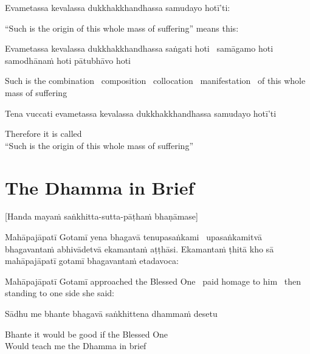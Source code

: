 Evametassa kevalassa dukkhakkhandhassa samudayo hotī’ti:

\begin{cprenglish}
  “Such is the origin of this whole mass of suffering” means this:
\end{cprenglish}

Evametassa kevalassa dukkhakkhandhassa saṅgati hoti \breathmark\ samāgamo hoti samodhānaṁ hoti pātubhāvo hoti

\begin{cprenglish}
  Such is the combination \breathmark\ composition \breathmark\ collocation \breathmark\ manifestation \breathmark\ of this whole mass of suffering
\end{cprenglish}

Tena vuccati evametassa kevalassa dukkhakkhandhassa samudayo hotī’ti

\begin{cprenglish}
  Therefore it is called\\
  “Such is the origin of this whole mass of suffering”
\end{cprenglish}


\clearpage

\section{The Dhamma in Brief}
\label{dhamma-in-brief}

\begin{center}
  [Handa mayaṁ saṅkhitta-sutta-pāṭhaṁ bhaṇāmase]
\end{center}

Mahāpajāpatī Gotamī yena bhagavā tenupasaṅkami \breathmark\ upasaṅkamitvā bhagavantaṁ abhivādetvā ekamantaṁ aṭṭhāsi. Ekamantaṁ ṭhitā kho sā mahāpajāpatī gotamī bhagavantaṁ etadavoca:

\begin{cprenglish}
  Mahāpajāpatī Gotamī approached the Blessed One \breathmark\ paid homage to him \breathmark\ then standing to one side she said:
\end{cprenglish}

Sādhu me bhante bhagavā saṅkhittena dhammaṁ desetu

\begin{cprenglish}
  Bhante it would be good if the Blessed One\\
  Would teach me the Dhamma in brief
\end{cprenglish}

